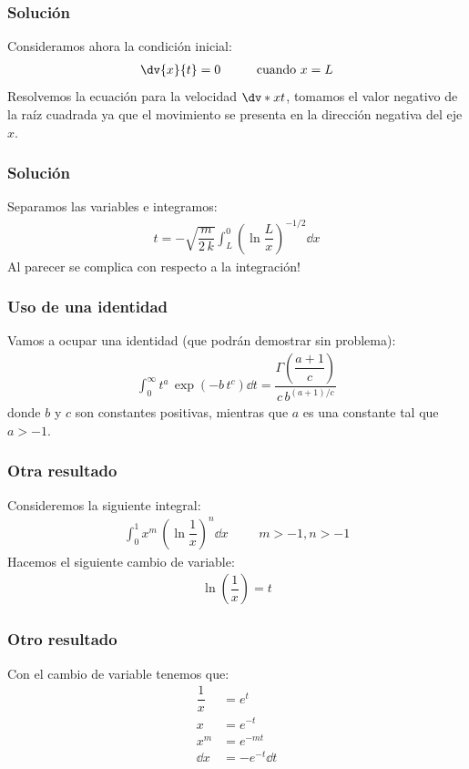 \begin{frame}
\frametitle{Solución}
Consideramos ahora la condición inicial:
\begin{align*}
\dv{x}{t} = 0 \hspace{1cm} \mbox{cuando } x = L
\end{align*}
\pause
Resolvemos la ecuación para la velocidad $\dv*{x}{t}$, tomamos el valor negativo de la raíz cuadrada ya que el movimiento se presenta en la dirección negativa del eje $x$.
\end{frame}
\begin{frame}
\frametitle{Solución}
Separamos las variables e integramos:
\begin{align*}
t = - \sqrt{\dfrac{m}{2 \, k}} \int_{L}^{0} \left( \ln \dfrac{L}{x} \right)^{-1/2} \dd{x}
\end{align*}
\pause
Al parecer se complica con respecto a la integración!
\end{frame}
\begin{frame}
\frametitle{Uso de una identidad}
Vamos a ocupar una identidad (que podrán demostrar sin problema):
\begin{align}
\int_{0}^{\infty} t^{a} \, \exp(-b \, t^{c}) \dd{t} = \dfrac{\Gamma \left( \dfrac{a + 1}{c} \right)}{c \, b^{(a+1)/c}}
\label{eq:identidad_Gamma}
\end{align}
donde $b$ y $c$ son constantes positivas, mientras que $a$ es una constante tal que $a > - 1$.
\end{frame}
\begin{frame}
\frametitle{Otra resultado}
Consideremos la siguiente integral:
\begin{align*}
\int_{0}^{1} x^{m} \, \left( \ln \dfrac{1}{x} \right)^{n} \dd{x} \hspace{1cm} m > -1, n > -1
\end{align*}
\pause
Hacemos el siguiente cambio de variable:
\begin{align*}
\ln \left(\dfrac{1}{x} \right) = t
\end{align*}
\end{frame}
\begin{frame}
\frametitle{Otro resultado}
Con el cambio de variable tenemos que:
\begin{align*}
\dfrac{1}{x} &= e^{t} \\[0.5em]
x &= e^{-t} \\[0.5em]
x^{m} &= e^{-m t} \\[0.5em]
\dd{x} &= - e^{-t} \dd{t}
\end{align*}
\end{frame}

